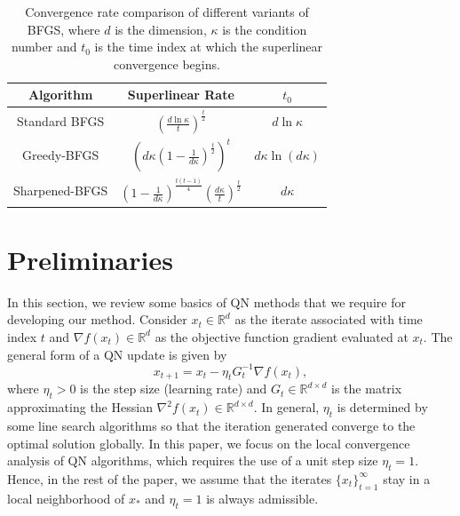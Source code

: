 \documentclass[11pt]{article}
\numberwithin{assumption}{section}
\numberwithin{remark}{section}
\numberwithin{theorem}{section}
\begin{document}
\renewcommand{\arraystretch}{1.2}
\begin{table}[t]
  \vspace{1mm}
  \centering
  \begin{tabular}{ |c|c|c| }
    \hline
    Algorithm & Superlinear Rate & $t_0$ \\
    \hline
    \hline
    Standard BFGS & $(\frac{d\ln{\kappa}}{t})^{\frac{t}{2}}$ & $d\ln{\kappa}$ \\
    \hline
    Greedy-BFGS & $\left(d\kappa(1 \!-\! \frac{1}{d\kappa})^{\frac{t}{2}}\right)^{t}$ & $d\kappa\ln{(d\kappa)}$ \\
    \hline
    Sharpened-BFGS& $(1 - \frac{1}{d\kappa})^{\frac{t(t - 1)}{4}} (\frac{d\kappa}{t})^{\frac{t}{2}}$ & $d\kappa$ \\
    \hline
  \end{tabular}
  \caption{Convergence rate comparison of different variants of BFGS, where $d$ is the dimension, $\kappa$ is the condition number and $t_0$ is the time index at which the  superlinear convergence begins.}
  \label{tab_1}
  \vspace{-2mm}
\end{table}

\section{Preliminaries}\label{sec:qn_method}

In this section, we review some basics of QN methods that we require for developing our method. Consider $x_t\in \mathbb{R}^d$ as the iterate associated with time index $t$ and $\nabla f(x_t)\in \mathbb{R}^d$ as the objective function gradient evaluated at $x_t$. The general form of a QN update is given by
\begin{equation}\label{qn_method}
    x_{t + 1} = x_t - \eta_t G_t^{-1} \nabla{f(x_t)},
\end{equation}
where $\eta_t > 0$ is the step size (learning rate) and $G_t\in \mathbb{R}^{d\times d}$ is the matrix approximating the Hessian $\nabla^2 f(x_t)\in \mathbb{R}^{d\times d}$. In general, $\eta_t$ is determined by some line search algorithms so that the iteration generated converge to the optimal solution globally. In this paper, we focus on the local convergence analysis of QN algorithms, which requires the use of a unit step size $\eta_t = 1$. Hence, in the rest of the paper, we assume that the iterates $\{x_t\}_{t = 1}^{\infty}$ stay in a local neighborhood of $x_*$ and  $\eta_t=1$ is always admissible.
\end{document}
